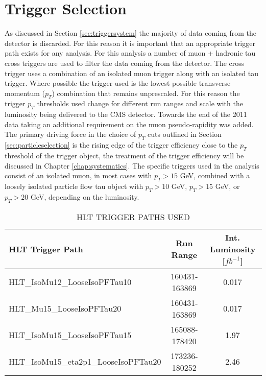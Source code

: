 \section{Trigger Selection}
\label{sec:triggerselection}
As discussed in Section \ref{sec:triggersystem} the majority of data coming from the detector is discarded. 
For this reason it is important that an appropriate trigger path exists for any analysis.
For this analysis a number of muon + hadronic tau cross triggers are used to filter the data coming from the detector.
The cross trigger uses a combination of an isolated muon trigger along with an isolated tau trigger.
Where possible the trigger used is the lowest possible transverse momentum ($p_{T}$) combination that remains unprescaled.
For this reason the trigger $p_{T}$ thresholds used change for different run ranges and scale with the luminosity being delivered to the CMS detector.
Towards the end of the 2011 data taking an additional requirement on the muon pseudo-rapidity was added.
The primary driving force in the choice of $p_{T}$ cuts outlined in Section \ref{sec:particleselection} is the rising edge of the trigger efficiency close to the $p_{T}$ threshold of the trigger object, the treatment of the trigger efficiency will be discussed in Chapter \ref{chap:systematics}.
The specific triggers used in the analysis consist of an isolated muon, in most cases with $p_{T} > 15$ GeV, combined with a loosely isolated particle flow tau object with $p_{T} > 10$ GeV, $p_{T} > 15$ GeV, or $p_{T} > 20$ GeV, depending on the luminosity.

\begin{table}[tpb]
  \setlength{\capwidth}{0.9\textwidth}
  \begin{small}
  \begin{center}
    \caption{HLT TRIGGER PATHS USED}
    \label{tab:triggerpaths}
    \begin{tabular}{lcc}
      \toprule
      HLT Trigger Path & Run Range & Int. Luminosity [$fb^{-1}$] \\
      \midrule
      HLT\_IsoMu12\_LooseIsoPFTau10 		& 160431-163869 & 0.017 \\
      HLT\_Mu15\_LooseIsoPFTau20    		& 160431-163869 & 0.017 \\
      HLT\_IsoMu15\_LooseIsoPFTau15 		& 165088-178420 & 1.97 \\  
      HLT\_IsoMu15\_eta2p1\_LooseIsoPFTau20 	& 173236-180252 & 2.46 \\
      \bottomrule
    \end{tabular}
  \end{center}
  \end{small}
\end{table}

